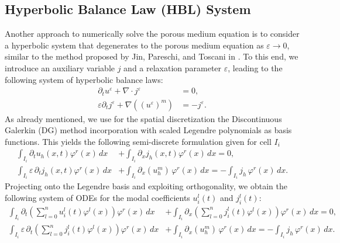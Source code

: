 \documentclass[a4paper,12pt]{paper}
\begin{document}
\subsection{Hyperbolic Balance Law (HBL) System}\label{sec:HBL}
Another approach to numerically solve the porous medium equation is to consider a hyperbolic system that degenerates to the porous medium equation as \( \varepsilon \to 0 \), similar to the method proposed by Jin, Pareschi, and Toscani in \cite{Jin1998}. 
To this end, we introduce an auxiliary variable \( j \) and a relaxation parameter \( \varepsilon \), leading to the following system of hyperbolic balance laws:
\begin{equation}
	\begin{aligned}
		\partial_t u^{\varepsilon} + \nabla \cdot j^{\varepsilon} &= 0, \\
		\varepsilon \partial_t j^{\varepsilon} + \nabla \left( \left( u^{\varepsilon} \right)^m \right) &= -j^{\varepsilon}.
	\end{aligned}
\end{equation}
As already mentioned, we use for the spatial discretization the Discontinuous Galerkin (DG) method incorporation with scaled Legendre polynomials as basis functions. This yields the following semi-discrete formulation given for cell \( I_i \)
\begin{equation*}
	\begin{aligned}
		\int_{I_i} \partial_t u_h(x,t) \varphi^r(x) \, dx 
		&+ \int_{I_i} \partial_x j_h(x,t) \varphi^r(x) \, dx = 0, \\
		\int_{I_i} \varepsilon \, \partial_t j_h(x,t) \varphi^r(x) \, dx 
		&+ \int_{I_i} \partial_x (u_h^m) \, \varphi^r(x) \, dx = -\int_{I_i} j_h \, \varphi^r(x) \, dx.
	\end{aligned}
\end{equation*}
Projecting onto the Legendre basis and exploiting orthogonality, we obtain the following system of ODEs for the modal coefficients \( u_i^l(t) \) and \( j_i^l(t) \):
\begin{equation*}
	\begin{aligned}
		\int_{I_i} \partial_t \left( \sum_{l=0}^{n} u_i^l(t) \varphi^l(x) \right) \varphi^r(x) \, dx 
		&+ \int_{I_i} \partial_x \left( \sum_{l=0}^{n} j_i^l(t) \varphi^l(x) \right) \varphi^r(x) \, dx = 0, \\
		\int_{I_i} \varepsilon \, \partial_t \left( \sum_{l=0}^{n} j_i^l(t) \varphi^l(x) \right) \varphi^r(x) \, dx 
		&+ \int_{I_i} \partial_x (u_h^m) \, \varphi^r(x) \, dx = -\int_{I_i} j_h \, \varphi^r(x) \, dx.
	\end{aligned}
\end{equation*}
\end{document}
